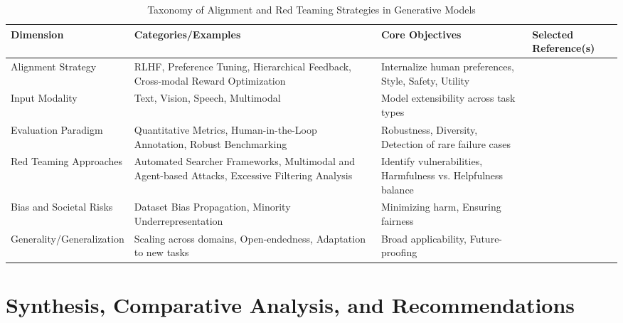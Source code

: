 \documentclass[sigconf]{acmart}
\begin{document}
\begin{table*}[htbp]
\centering
\caption{Taxonomy of Alignment and Red Teaming Strategies in Generative Models}
\label{tab:alignment-taxonomy}
\begin{adjustbox}{max width=\textwidth}
\begin{tabular}{@{}llll@{}}
\toprule
\textbf{Dimension}       & \textbf{Categories/Examples}                                                                                & \textbf{Core Objectives}                                     & \textbf{Selected Reference(s)} \\
\midrule
Alignment Strategy       & RLHF, Preference Tuning, Hierarchical Feedback, Cross-modal Reward Optimization                             & Internalize human preferences, Style, Safety, Utility         & \cite{ref69,ref75}             \\
Input Modality           & Text, Vision, Speech, Multimodal                                                                           & Model extensibility across task types                         & \cite{ref69,ref75}             \\
Evaluation Paradigm      & Quantitative Metrics, Human-in-the-Loop Annotation, Robust Benchmarking                                    & Robustness, Diversity, Detection of rare failure cases        & \cite{ref69,ref75}             \\
Red Teaming Approaches   & Automated Searcher Frameworks, Multimodal and Agent-based Attacks, Excessive Filtering Analysis            & Identify vulnerabilities, Harmfulness vs. Helpfulness balance & \cite{ref67,ref75}             \\
Bias and Societal Risks  & Dataset Bias Propagation, Minority Underrepresentation                                                     & Minimizing harm, Ensuring fairness                           & \cite{ref69,ref75}             \\
Generality/Generalization & Scaling across domains, Open-endedness, Adaptation to new tasks                                           & Broad applicability, Future-proofing                          & \cite{ref69,ref75}             \\
\bottomrule
\end{tabular}
\end{adjustbox}
\end{table*}

\section{Synthesis, Comparative Analysis, and Recommendations}
\end{document}
